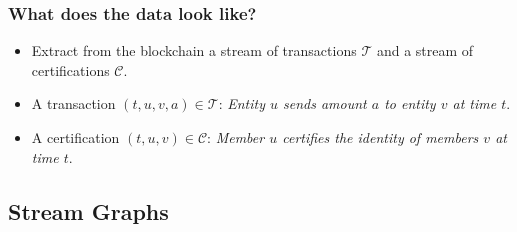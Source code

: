 \documentclass{beamer}
\begin{document}
\begin{frame}
	\frametitle{What does the \textbf{data} look like?}
	\begin{itemize}
		\item<1-> Extract from the blockchain a stream of transactions $\mathcal{T}$ and a stream of certifications $\mathcal{C}$.
		\item<2-> A transaction $\left(t,u,v,a\right) \in \mathcal{T}$: \textit{Entity $u$ sends amount $a$ to entity $v$ at time $t$}.
		\item<3-> A certification $\left(t,u,v\right) \in \mathcal{C}$: \textit{Member $u$ certifies the identity of members $v$ at time $t$}.
	\end{itemize}
\end{frame}

\subsection{Stream Graphs}
\end{document}
